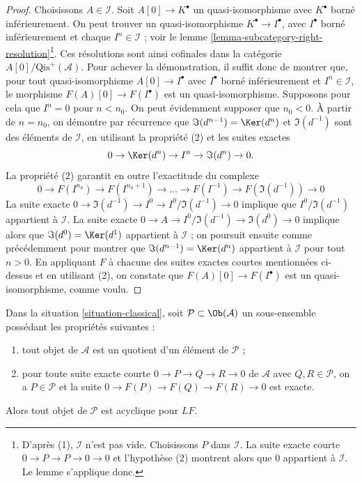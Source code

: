 \begin{proof}
Choisissons $A \in \mathcal{I}$. Soit $A[0] \to K^\bullet$ un
quasi-isomorphisme avec $K^\bullet$ borné inférieurement. On peut trouver un
quasi-isomorphisme $K^\bullet \to I^\bullet$, avec $I^\bullet$ borné
inférieurement et chaque $I^n \in \mathcal{I}$ ; voir le
lemme \ref{lemma-subcategory-right-resolution}\footnote{D'après (1),
$\mathcal{I}$ n'est pas vide. Choisissons $P$ dans $\mathcal{I}$. La suite
exacte courte $0 \to P \to P \to 0 \to 0$ et l'hypothèse (2) montrent alors
que $0$ appartient à $\mathcal{I}$. Le lemme s'applique donc.}. Ces résolutions
sont ainsi cofinales dans la catégorie
$A[0]/\text{Qis}^{+}(\mathcal{A})$. Pour achever la démonstration, il suffit
donc de montrer que, pour tout quasi-isomorphisme
$A[0] \to I^\bullet$ avec $I^\bullet$ borné inférieurement et
$I^n \in \mathcal{I}$, le morphisme
$F(A)[0] \to F(I^\bullet)$ est un quasi-isomorphisme.
Supposons pour cela que $I^n = 0$ pour $n < n_0$. On peut évidemment supposer
que $n_0 < 0$. À partir de $n = n_0$, on démontre par récurrence que
$\Im(d^{n - 1}) = \Ker(d^n)$ et $\Im(d^{-1})$ sont des éléments de
$\mathcal{I}$, en utilisant la propriété (2) et les suites exactes
$$
0 \to \Ker(d^n) \to I^n \to \Im(d^n) \to 0.
$$
La propriété (2) garantit en outre l'exactitude du complexe
$$
0 \to F(I^{n_0}) \to F(I^{n_0 + 1}) \to \ldots \to F(I^{-1}) \to
F(\Im(d^{-1})) \to 0
$$
La suite exacte
$0 \to \Im(d^{-1}) \to I^0 \to I^0/\Im(d^{-1}) \to 0$ implique que
$I^0/\Im(d^{-1})$ appartient à $\mathcal{I}$. La suite exacte
$0 \to A \to I^0/\Im(d^{-1}) \to \Im(d^0) \to 0$ implique alors que
$\Im(d^0) = \Ker(d^1)$ appartient à $\mathcal{I}$ ; on poursuit ensuite comme
précédemment pour montrer que
$\Im(d^{n - 1}) = \Ker(d^n)$ appartient à $\mathcal{I}$ pour tout $n > 0$.
En appliquant $F$ à chacune des suites exactes courtes mentionnées ci-dessus et
en utilisant (2), on constate que
$F(A)[0] \to F(I^\bullet)$ est un quasi-isomorphisme, comme voulu.
\end{proof}

\begin{lemma}
\label{lemma-subcategory-left-acyclics}
Dans la situation \ref{situation-classical}, soit
$\mathcal{P} \subset \Ob(\mathcal{A})$ un sous-ensemble possédant les
propriétés suivantes :
\begin{enumerate}
\item tout objet de $\mathcal{A}$ est un quotient d'un élément de
$\mathcal{P}$ ;
\item pour toute suite exacte courte $0 \to P \to Q \to R \to 0$ de
$\mathcal{A}$ avec $Q, R \in \mathcal{P}$, on a $P \in \mathcal{P}$ et la
suite $0 \to F(P) \to F(Q) \to F(R) \to 0$ est exacte.
\end{enumerate}
Alors tout objet de $\mathcal{P}$ est acyclique pour $LF$.
\end{lemma}

